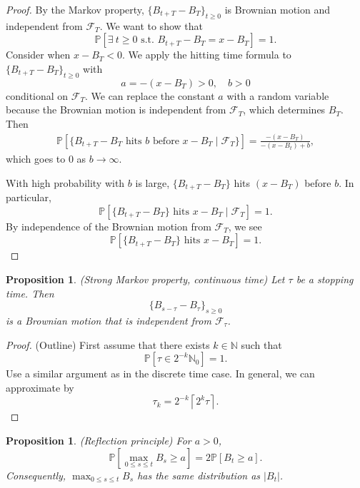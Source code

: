 \documentclass{tufte-handout}
\newcommand*\N{\mathbb{N}}
\renewcommand*\P{\mathbb{P}}
\newtheorem{prop}[thm]{Proposition}
\theoremstyle{definition}
\begin{document}
\begin{proof}
	By the Markov property, $\{B_{t + T} - B_T\}_{t\ge 0}$ is Brownian motion and independent from $\mathscr{F}_T$. 
	We want to show that \[
		\P\left[\exists\ t \ge 0 \text{ s.t. } B_{t+T} - B_T = x - B_T\right] = 1
	.\] Consider when $x - B_T < 0$. We apply the hitting time formula to $\{B_{t + T} - B_T\}_{t\ge 0}$ with \[
		a = -\left( x - B_T \right) > 0, \quad b > 0
	\] conditional on $\mathscr{F}_T$. We can replace the constant $a$ with a random variable because the Brownian motion is independent from $\mathscr{F}_T$, which determines $B_T$. Then
	\begin{align*}
		\P\left[\{B_{t + T} - B_T \text{ hits $b$ before } x - B_T \mid \mathscr{F}_T\}\right] = \frac{-\left( x-B_T \right)}{-\left( x-B_t \right)+b}
	,\end{align*} which goes to $0$ as $b \to \infty$.
	
	With high probability with $b$ is large, $\{B_{t  +T} - B_T\}$ hits $\left( x-B_T \right)$ before $b$. In particular, \[
		\P\left[\{B_{t + T} - B_T\} \text{ hits } x - B_T \mid \mathscr{F}_T\right] = 1
.\] By independence of the Brownian motion from $\mathscr{F}_T$, we see \[
		\P\left[\{B_{t + T} - B_T\} \text{ hits } x - B_T\right] = 1
	.\] 
\end{proof}

\begin{prop}
	(Strong Markov property, continuous time) Let $\tau$ be a stopping time. Then \[
		\{B_{s-\tau} - B_\tau\}_{s \ge 0}
	\] is a Brownian motion that is independent from $\mathscr{F}_\tau$.
\end{prop}

\begin{proof}
	(Outline) First assume that there exists $k \in \N$ such that \[
		\P\left[\tau \in 2^{-k}\N_0\right] = 1
	.\] Use a similar argument as in the discrete time case. In general, we can approximate by \[
		\tau_k = 2^{-k} \left\lceil 2^{k}\tau \right\rceil 
	.\] 
\end{proof}

\begin{prop}
	(Reflection principle) For $a > 0$, \[
		\P\left[\max_{0 \le s \le t} B_s \ge a\right] = 2 \P\left[B_t \ge a\right] 
	.\] Consequently, $\max_{0 \le s \le t} B_s$ has the same distribution as $\left| B_t \right|$. 
\end{prop}
\end{document}
